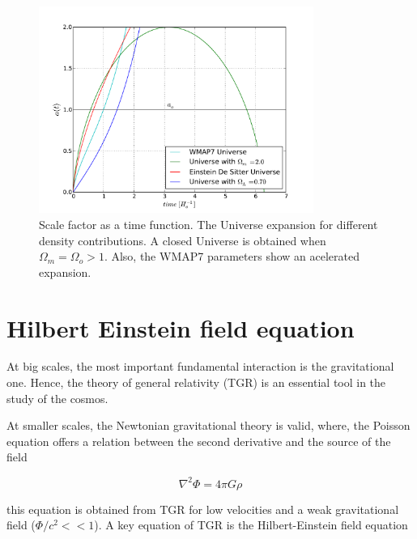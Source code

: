 \begin{figure}[htbp]
       \centering
               \includegraphics[width=0.8\textwidth]{Images/chapter2/factordeescala.pdf}
       \caption{ \small Scale factor as a time function. The Universe expansion for 
       different density contributions. A closed Universe is obtained when 
       $\Omega_m = \Omega_o>1$. Also, the WMAP7 parameters show an acelerated expansion. 
        }
       \label{factor}
 \end{figure}

\section{Hilbert Einstein field equation}

At big scales, the most important fundamental interaction is the 
gravitational one. Hence, the theory of general relativity (TGR) is 
an essential tool in the study of the cosmos. 

At smaller scales, the Newtonian gravitational theory is valid, where, 
the Poisson equation offers a relation between the second derivative
and the source of the field 

\[ \nabla^2\Phi=4\pi G\rho\]

this equation is obtained from TGR for low velocities and 
a weak gravitational field ($\Phi/c^2<< 1$). A key equation of TGR is
the Hilbert-Einstein field equation

